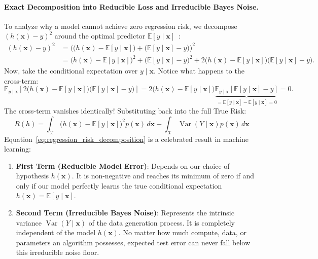 \paragraph{Exact Decomposition into Reducible Loss and Irreducible Bayes Noise.}
To analyze why a model cannot achieve zero regression risk, we decompose $(h(\mathbf{x}) - y)^2$ around the optimal predictor $\mathbb{E}[y \mid \mathbf{x}]$~\cite{bishop2024deep}:
\begin{align}
(h(\mathbf{x}) - y)^2 &= \Big( \big( h(\mathbf{x}) - \mathbb{E}[y \mid \mathbf{x}] \big) + \big( \mathbb{E}[y \mid \mathbf{x}] - y \big) \Big)^2 \nonumber \\
&= \big( h(\mathbf{x}) - \mathbb{E}[y \mid \mathbf{x}] \big)^2 + \big( \mathbb{E}[y \mid \mathbf{x}] - y \big)^2 + 2 \big( h(\mathbf{x}) - \mathbb{E}[y \mid \mathbf{x}] \big) \big( \mathbb{E}[y \mid \mathbf{x}] - y \big).
\end{align}
Now, take the conditional expectation over $y \mid \mathbf{x}$. Notice what happens to the cross-term:
\begin{equation}
\mathbb{E}_{y \mid \mathbf{x}}\left[ 2 \big( h(\mathbf{x}) - \mathbb{E}[y \mid \mathbf{x}] \big) \big( \mathbb{E}[y \mid \mathbf{x}] - y \big) \right] = 2 \big( h(\mathbf{x}) - \mathbb{E}[y \mid \mathbf{x}] \big) \underbrace{\mathbb{E}_{y \mid \mathbf{x}}\left[ \mathbb{E}[y \mid \mathbf{x}] - y \right]}_{= \mathbb{E}[y \mid \mathbf{x}] - \mathbb{E}[y \mid \mathbf{x}] = 0} = 0.
\end{equation}
The cross-term vanishes identically! Substituting back into the full True Risk:
\begin{equation}
\boxed{ R(h) = \int_{\mathcal{X}} \big( h(\mathbf{x}) - \mathbb{E}[y \mid \mathbf{x}] \big)^2 p(\mathbf{x}) \, d\mathbf{x} + \int_{\mathcal{X}} \operatorname{Var}(Y \mid \mathbf{x}) p(\mathbf{x}) \, d\mathbf{x} }
\label{eq:regression_risk_decomposition}
\end{equation}
Equation~\eqref{eq:regression_risk_decomposition} is a celebrated result in machine learning:
\begin{enumerate}[noitemsep]
  \item \textbf{First Term (Reducible Model Error)}: Depends on our choice of hypothesis $h(\mathbf{x})$. It is non-negative and reaches its minimum of zero if and only if our model perfectly learns the true conditional expectation $h(\mathbf{x}) = \mathbb{E}[y \mid \mathbf{x}]$.
  \item \textbf{Second Term (Irreducible Bayes Noise)}: Represents the intrinsic variance $\operatorname{Var}(Y \mid \mathbf{x})$ of the data generation process. It is completely independent of the model $h(\mathbf{x})$. No matter how much compute, data, or parameters an algorithm possesses, expected test error can never fall below this irreducible noise floor.
\end{enumerate}

